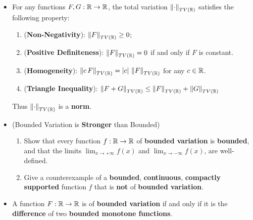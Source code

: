 \documentclass[11pt]{article}
\begin{document}
\begin{itemize}
\item \begin{proposition}
For any functions $F, G: {\mathbb R} \rightarrow {\mathbb R}$, the total variation $\left\|\cdot\right\|_{TV({\mathbb R})}$ satisfies the following property:
\begin{enumerate}
\item (\textbf{Non-Negativity}): $\left\|F\right\|_{TV({\mathbb R})} \ge 0$; 
\item (\textbf{Positive Definiteness}): $\left\|F\right\|_{TV({\mathbb R})} = 0$ if and only if $F$ is constant.
\item (\textbf{Homogeneity}): $\left\|c\,F\right\|_{TV({\mathbb R})} =\left\lvert c \right\rvert\,\left\|F\right\|_{TV({\mathbb R})}$ for any $c \in {\mathbb R}$.
\item (\textbf{Triangle Inequality}): $\left\|F + G\right\|_{TV({\mathbb R})} \le \left\|F\right\|_{TV({\mathbb R})} + \left\|G\right\|_{TV({\mathbb R})}$
\end{enumerate} Thus $\left\|\cdot\right\|_{TV({\mathbb R})}$ is a \textbf{norm}.
\end{proposition}

\item \begin{exercise} (Bounded Variation is \textbf{Stronger} than Bounded)
\begin{enumerate}
\item Show that every function $f : {\mathbb R} \rightarrow {\mathbb R}$ of \textbf{bounded variation} is \textbf{bounded}, and that the limits $\lim_{x\rightarrow+\infty} f(x)$
and $\lim_{x\rightarrow-\infty} f(x)$, are well-defined.
\item Give a counterexample of a \textbf{bounded}, \textbf{continuous}, \textbf{compactly supported} function $f$ that is \textbf{not} of \textbf{bounded variation}.
\end{enumerate}
\end{exercise}

\item 
\begin{proposition}
A function $F : {\mathbb R} \rightarrow {\mathbb R}$ is of \textbf{bounded variation} if and only if it is the \textbf{difference} of two \textbf{bounded monotone functions}.
\end{proposition}


\end{itemize}
\end{document}
